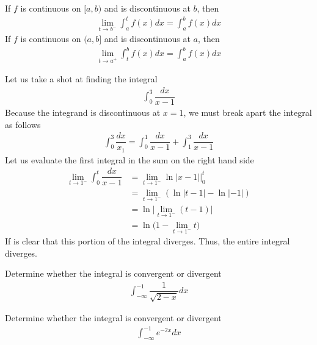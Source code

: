 \begin{definition}
If $f$ is continuous on $[a, b)$ and is discontinuous at $b$, then 
\begin{align*}
    \lim_{t \longrightarrow b^{-}} \int_{a}^{t} f(x) dx = \int_{a}^{b} f(x) dx
\end{align*}
If $f$ is continuous on $(a, b]$ and is discontinuous at $a$, then 
\begin{align*}
    \lim_{t \longrightarrow a^{+}} \int_{t}^{b} f(x) dx = \int_{a}^{b} f(x) dx
\end{align*}
\end{definition}

\begin{example}
Let us take a shot at finding the integral
\begin{align*}
    \int_{0}^{3} \dfrac{dx}{x - 1}
\end{align*}
Because the integrand is discontinuous at $x = 1$, we must break apart the integral as follows
\begin{align*}
    \int_{0}^{3} \dfrac{dx}{x_1} = \int_{0}^{1} \dfrac{dx}{x-1} + \int_{1}^{3} \dfrac{dx}{x-1} 
\end{align*}
Let us evaluate the first integral in the sum on the right hand side
\begin{align*}
    \lim_{t \longrightarrow 1^{-}} \int_{0}^{t} \dfrac{dx}{x-1} &= \lim_{t \longrightarrow 1^{-}} \ln \lvert x - 1 \rvert \Big|_{0}^{t}\\[2ex]
    &= \lim_{t \longrightarrow 1^{-}} (\ln \lvert t - 1 \rvert - \ln \lvert -1 \rvert)\\[2ex]
    &= \ln \Big\lvert \lim_{t \longrightarrow 1^{-}} (t - 1) \Big\rvert\\[2ex]
    &= \ln \Big(1 - \lim_{t \longrightarrow 1^{-}} t \Big)
\end{align*}
If is clear that this portion of the integral diverges. Thus, the entire integral diverges. 
\end{example}

\begin{exercise}
Determine whether the integral is convergent or divergent
\begin{align*}
    \int_{-\infty}^{-1} \dfrac{1}{\sqrt{2-x}} dx
\end{align*}
\end{exercise}

\begin{exercise}
Determine whether the integral is convergent or divergent
\begin{align*}
    \int_{-\infty}^{-1} e^{-2x} dx
\end{align*}
\end{exercise}

